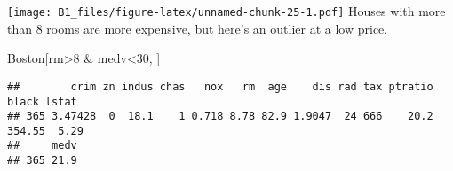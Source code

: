 \documentclass[
]{article}
\newenvironment{Shaded}{\begin{snugshade}}{\end{snugshade}}
\newcommand{\DecValTok}[1]{\textcolor[rgb]{0.00,0.00,0.81}{#1}}
\newcommand{\NormalTok}[1]{#1}
\newcommand{\SpecialCharTok}[1]{\textcolor[rgb]{0.00,0.00,0.00}{#1}}
\begin{document}
\texttt{[image: B1\_files/figure-latex/unnamed-chunk-25-1.pdf]} Houses
with more than 8 rooms are more expensive, but here's an outlier at a
low price.

\begin{Shaded}
\begin{Highlighting}[]
\NormalTok{Boston[rm}\SpecialCharTok{\textgreater{}}\DecValTok{8} \SpecialCharTok{\&}\NormalTok{ medv}\SpecialCharTok{\textless{}}\DecValTok{30}\NormalTok{, ]}
\end{Highlighting}
\end{Shaded}

\begin{verbatim}
##        crim zn indus chas   nox   rm  age    dis rad tax ptratio  black lstat
## 365 3.47428  0  18.1    1 0.718 8.78 82.9 1.9047  24 666    20.2 354.55  5.29
##     medv
## 365 21.9
\end{verbatim}
\end{document}
